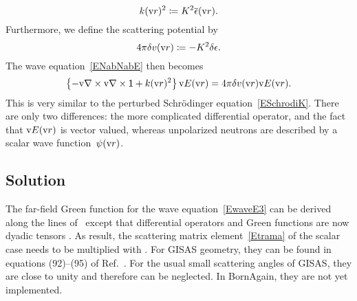 \begin{equation}
  k(\text{v}{r})^2 \coloneqq K^2 \overline{\epsilon}(\text{v}{r}).
\end{equation}
Furthermore, we define the scattering potential by
%
\begin{equation}
  4\pi\delta v(\text{v}{r}) \coloneqq - K^2\delta\epsilon.
\end{equation}
The wave equation~\cref{ENabNabE} then becomes
\begin{equation}\label{EwaveE3}
  \left\{-\text{v}{\nabla}\times\text{v}{\nabla}\times\mathsf{1} + k(\text{v}{r})^2\right\}\text{v}{E}(\text{v}{r})
  = 4\pi\delta v(\text{v}{r})\text{v}{E}(\text{v}{r}).
\end{equation}
%
%
This is very similar to the perturbed Schrödinger equation~\cref{ESchrodiK}.
%
%
There are only two differences:
the more complicated differential operator,
and the fact that $\text{v}{E}(\text{v}{r})$ is vector valued,
whereas unpolarized neutrons are described by a scalar wave function~$\psi(\text{v}{r})$.

\subsection{Solution}\label{SXscasol}

\def\TD{\TENS{D}}
\def\TG{\TENS{G}}
\def\TDo{\TENS{\overset{o}{D}}}
\def\TGo{\TENS{\overset{o}{G}}}
\def\Ef{\v{E}_\sf}
\def\Efo{\TENS{\overset{o}{\v{E}}}_\sf}
\def\Efoc{\Efo^*}

The far-field Green function for the wave equation~\cref{EwaveE3}
can be derived along the lines of~
except that differential operators and Green functions are now dyadic tensors \cite{DiWa84}.
As result, the scattering matrix element~\cref{Etrama} of the scalar case
needs to be multiplied with .
%
For GISAS geometry, they can be found in equations (92)--(95) of Ref.~\cite{ReLL09}.
For the usual small scattering angles of GISAS,
they are close to unity and therefore can be neglected.
In BornAgain, they are not yet implemented.

